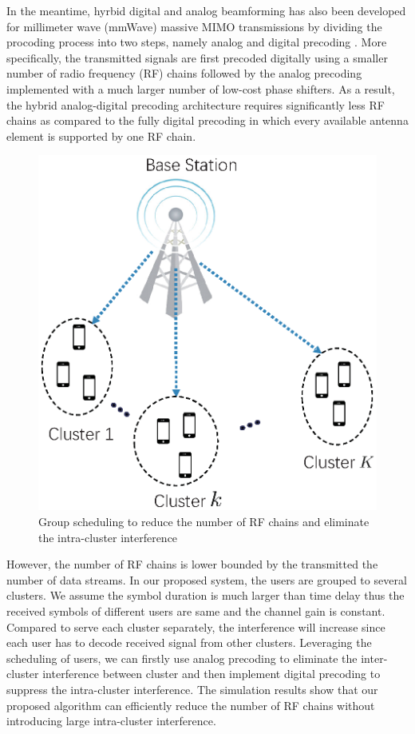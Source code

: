 \documentclass[conference]{IEEEtran}
\begin{document}
In the meantime, hyrbid digital and analog beamforming has also been developed for millimeter wave (mmWave) massive MIMO transmissions by dividing the procoding process into two steps, namely analog and digital precoding \cite{han2015large, el2014spatially}. More specifically, the transmitted signals are first precoded digitally using a smaller number of radio frequency (RF) chains followed by the analog precoding implemented with a much larger number of low-cost phase shifters. As a result, the hybrid analog-digital precoding architecture requires significantly less RF chains as compared to the fully digital precoding in which every available antenna element is supported by one RF chain. 

\begin{figure}[h]
	\begin{center}
		\includegraphics[scale=0.55]{PPTFigure/groupcluster.eps}
		\caption{Group scheduling to reduce the number of RF chains and eliminate the intra-cluster interference}\label{fig:BDMA}
	\end{center}
\end{figure}

{\color{red}However, the number of RF chains is lower bounded by the transmitted the number of data streams. In our proposed system, the users are grouped to several clusters. We assume the symbol duration is much larger than time delay thus the received symbols of different users are same and the channel gain is constant. Compared to serve each cluster separately, the interference will increase since each user has to decode received signal from other clusters. Leveraging the scheduling of users, we can firstly use analog precoding to eliminate the inter-cluster interference between cluster and then implement digital precoding to suppress the intra-cluster interference. The simulation results show that our proposed algorithm can efficiently reduce the number of RF chains without introducing large intra-cluster interference.} 
\end{document}
